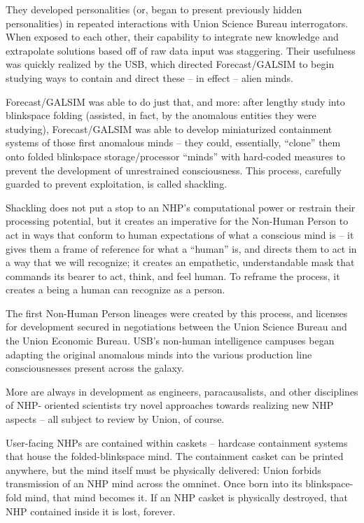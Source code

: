 They developed personalities (or, began to present previously hidden personalities) in repeated
interactions with Union Science Bureau interrogators. When exposed to each other, their
capability to integrate new knowledge and extrapolate solutions based off of raw data input was
staggering. Their usefulness was quickly realized by the USB, which directed Forecast/GALSIM
to begin studying ways to contain and direct these -- in effect -- alien minds.

Forecast/GALSIM was able to do just that, and more: after lengthy study into blinkspace folding
(assisted, in fact, by the anomalous entities they were studying), Forecast/GALSIM was able to
develop miniaturized containment systems of those first anomalous minds -- they could,
essentially, ``clone'' them onto folded blinkspace storage/processor ``minds'' with hard-coded
measures to prevent the development of unrestrained consciousness. This process, carefully
guarded to prevent exploitation, is called shackling.

Shackling does not put a stop to an NHP's computational power or restrain their processing
potential, but it creates an imperative for the Non-Human Person to act in ways that conform to
human expectations of what a conscious mind is -- it gives them a frame of reference for what a
``human'' is, and directs them to act in a way that we will recognize; it creates an empathetic,
understandable mask that commands its bearer to act, think, and feel human. To reframe the
process, it creates a being a human can recognize as a person.

The first Non-Human Person lineages were created by this process, and licenses for
development secured in negotiations between the Union Science Bureau and the Union
Economic Bureau. USB's non-human intelligence campuses began adapting the original
anomalous minds into the various production line consciousnesses present across the galaxy.

More are always in development as engineers, paracausalists, and other disciplines of NHP-
oriented scientists try novel approaches towards realizing new NHP aspects -- all subject to
review by Union, of course.

User-facing NHPs are contained within caskets -- hardcase containment systems that house the
folded-blinkspace mind. The containment casket can be printed anywhere, but the mind itself
must be physically delivered: Union forbids transmission of an NHP mind across the omninet.
Once born into its blinkspace-fold mind, that mind becomes it. If an NHP casket is physically
destroyed, that NHP contained inside it is lost, forever.

